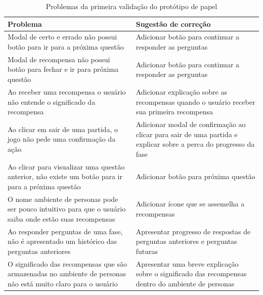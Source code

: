 \begin{apendicesenv}
{\begin{table}[htbp]
\centering
\caption{\textcolor{textadded}{Problemas da primeira validação do protótipo de papel}}
\begin{tabular}{|p{7.5cm}|p{7.5cm}|}
\hline
\textbf{\textcolor{textadded}{Problema}}                       & \textbf{\textcolor{textadded}{Sugestão de correção}} \\ \hline
\textcolor{textadded}{Modal de certo e errado não possui botão para ir para a próxima questão} & \textcolor{textadded}{Adicionar botão para continuar a responder as perguntas}      \\ \hline
\textcolor{textadded}{Modal de recompensa não possui botão para fechar e ir para próxima questão} & \textcolor{textadded}{Adicionar botão para continuar a responder as perguntas}      \\ \hline
\textcolor{textadded}{Ao receber uma recompensa o usuário não entende o significado da recompensa} & \textcolor{textadded}{Adicionar explicação sobre as recompensas quando o usuário receber sua primeira recompensa}       \\ \hline
\textcolor{textadded}{Ao clicar em sair de uma partida, o jogo não pede uma confirmação da ação} & \textcolor{textadded}{Adicionar modal de confirmação ao clicar para sair de uma partida e explicar sobre a perca do progresso da fase}    \\ \hline
\textcolor{textadded}{Ao clicar para visualizar uma questão anterior, não existe um botão para ir para a próxima questão} & \textcolor{textadded}{Adicionar botão para próxima questão}    \\ \hline
\textcolor{textadded}{O nome ambiente de personas pode ser pouco intuitivo para que o usuário saiba onde estão suas recompensas} & \textcolor{textadded}{Adicionar ícone que se assemelha a recompensas}  \\ \hline
\textcolor{textadded}{Ao responder perguntas de uma fase, não é apresentado um histórico das perguntas anteriores} & \textcolor{textadded}{Apresentar progresso de respostas de perguntas anteriores e perguntas futuras}   \\ \hline
\textcolor{textadded}{O significado das recompensas que são armazenadas no ambiente de personas não está muito claro para o usuário} & \textcolor{textadded}{Apresentar uma breve explicação sobre o significado das recompensas dentro do ambiente de personas}   \\ \hline
\end{tabular}
\label{tab:Table_resultados_prototipo_de_papel_1}
\end{table}

}
\end{apendicesenv}
